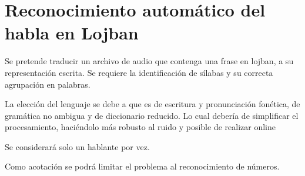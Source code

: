 \documentclass[a4paper,10pt]{article}
\begin{document}
\section{Reconocimiento automático del habla en Lojban}
	Se pretende traducir un archivo de audio que contenga una frase en lojban, a su representación escrita.
	Se requiere la identificación de sílabas y su correcta agrupación en palabras. 

	La elección del lenguaje se debe a que es de escritura y pronunciación fonética, de gramática no ambigua y de diccionario reducido.
	Lo cual debería de simplificar el procesamiento, haciéndolo más robusto al ruido y posible de realizar online

	Se considerará solo un hablante por vez. 

	Como acotación se podrá limitar el problema al reconocimiento de números.
\end{document}
